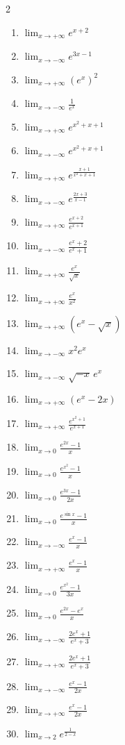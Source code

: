 \documentclass[12pt,a4paper]{article}
\begin{document}
\begin{multicols}{2}
\setlength{\columnseprule}{0.1mm}
\begin{enumerate}
\item $\lim_{x \to +\infty} e^{x+2}$
\item $\lim_{x \to -\infty} e^{3x-1}$
\item $\lim_{x \to +\infty} (e^x)^2$
\item $\lim_{x \to -\infty} \frac{1}{e^x}$
\item $\lim_{x \to +\infty} e^{x^2 + x + 1}$

\item $\lim_{x \to -\infty} e^{x^2 + x + 1}$
\item $\lim_{x \to +\infty} e^{\frac{x+1}{x^2 + x + 1}}$
\item $\lim_{x \to -\infty} e^{\frac{2x+3}{x-1}}$
\item $\lim_{x \to +\infty} \frac{e^{x+2}}{e^{x+1}}$
\item $\lim_{x \to -\infty} \frac{e^x + 2}{e^x + 1}$

\item $\lim_{x \to +\infty} \frac{e^x}{\sqrt{x}}$
\item $\lim_{x \to +\infty} \frac{e^x}{x^2}$
\item $\lim_{x \to +\infty} (e^x - \sqrt{x})$
\item $\lim_{x \to -\infty} x^2 e^x$
\item $\lim_{x \to -\infty} \sqrt{-x} \, e^x$

\item $\lim_{x \to +\infty} (e^x - 2x)$
\item $\lim_{x \to +\infty} \frac{e^{x^2 + 1}}{e^{x+1}}$
\item $\lim_{x \to 0} \frac{e^{2x} - 1}{x}$
\item $\lim_{x \to 0} \frac{e^{x^2} - 1}{x}$
\item $\lim_{x \to 0} \frac{e^{3x} - 1}{2x}$

\item $\lim_{x \to 0} \frac{e^{\sin x} - 1}{x}$
\item $\lim_{x \to -\infty} \frac{e^x - 1}{x}$
\item $\lim_{x \to +\infty} \frac{e^x - 1}{x}$
\item $\lim_{x \to 0} \frac{e^{x^2} - 1}{3x}$
\item $\lim_{x \to 0} \frac{e^{2x} - e^x}{x}$

\item $\lim_{x \to -\infty} \frac{2e^x + 1}{e^x + 3}$
\item $\lim_{x \to +\infty} \frac{2e^x + 1}{e^x + 3}$
\item $\lim_{x \to -\infty} \frac{e^x - 1}{2x}$
\item $\lim_{x \to +\infty} \frac{e^x - 1}{2x}$
\item $\lim_{x \to 2} e^{\frac{1}{2-x}}$


\end{enumerate}
\end{multicols}
\end{document}
